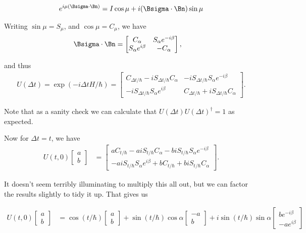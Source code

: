 \begin{align}\label{eqn:desaiCh5:620}
e^{i \mu (\Bsigma \cdot \Bn) } = I \cos\mu + i (\Bsigma \cdot \Bn) \sin\mu
\end{align}

Writing $\sin\mu = S_\mu$, and $\cos\mu = C_\mu$, we have
\begin{align}\label{eqn:desaiCh5:625}
\Bsigma \cdot \Bn &=
\begin{bmatrix}
C_\alpha & S_\alpha e^{-i\beta} \\
S_\alpha e^{i\beta} & -C_\alpha
\end{bmatrix},
\end{align}

and thus
\begin{align}\label{eqn:desaiCh5:630}
U(\Delta t) = \exp( -i \Delta t H /\hbar )
=
\begin{bmatrix}
C_{\Delta t/\hbar} -i S_{\Delta t/\hbar} C_\alpha & -i S_{\Delta t/\hbar} S_\alpha e^{-i\beta} \\
-i S_{\Delta t/\hbar} S_\alpha e^{i\beta} & C_{\Delta t/\hbar} + i S_{\Delta t/\hbar} C_\alpha
\end{bmatrix}.
\end{align}

Note that as a sanity check we can calculate that $ U(\Delta t) U(\Delta t)^\dagger = 1$ as expected.

Now for $\Delta t = t$, we have 
\begin{align}\label{eqn:desaiCh5:640}
U(t,0) 
\begin{bmatrix}
a \\
b
\end{bmatrix}
&=
\begin{bmatrix}
a C_{t/\hbar} -a i S_{t/\hbar} C_\alpha  - b i S_{t/\hbar} S_\alpha e^{-i\beta} \\
-a i S_{t/\hbar} S_\alpha e^{i\beta} + b C_{t/\hbar} + b i S_{t/\hbar} C_\alpha
\end{bmatrix}.
\end{align}

It doesn't seem terribly illuminating to multiply this all out, but we can factor the results slightly to tidy it up.  That gives us

\begin{align}\label{eqn:desaiCh5:650}
U(t,0) 
\begin{bmatrix}
a \\
b
\end{bmatrix}
&=
\cos(t/\hbar)
\begin{bmatrix}
a \\
b
\end{bmatrix}
+ 
\sin(t/\hbar) \cos\alpha
\begin{bmatrix}
-a \\
b
\end{bmatrix}
+ i
\sin(t/\hbar) \sin\alpha
\begin{bmatrix}
b e^{-i\beta} \\
-a e^{i \beta}
\end{bmatrix}
\end{align}

